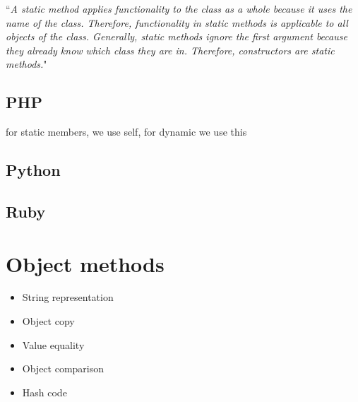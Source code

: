 \documentclass{KodeBook}
\begin{document}


``\textit{A static method applies functionality to the class as a whole because it uses the name of the class. Therefore, functionality in static methods is applicable to all objects of the class. Generally, static methods ignore the first argument because they already know which class they are in. Therefore, constructors are static methods.}"

\subsection{PHP}







for static members, we use self, for dynamic we use this

\subsection{Python}



\subsection{Ruby}








\section{Object methods}

\begin{itemize}
	\item String representation
	\item Object copy
	\item Value equality
	\item Object comparison
	\item Hash code
\end{itemize}
\end{document}
